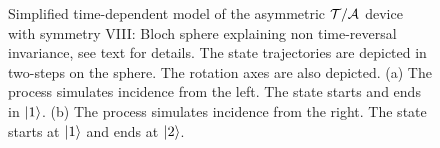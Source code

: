 \begin{figure}
	\caption{Simplified time-dependent model of the asymmetric ${\cal T/A}$ device with symmetry VIII: Bloch sphere explaining non time-reversal invariance, see text for details. The state trajectories are depicted in two-steps on the sphere. The rotation axes are
	also depicted. (a) The process simulates incidence from the left. The state starts and ends in $|1\rangle$. (b) The process simulates incidence from the right. The state starts at $|1\rangle$ and ends at $|2\rangle$.
	\label{fig_t_a_simple2}}
\end{figure}


